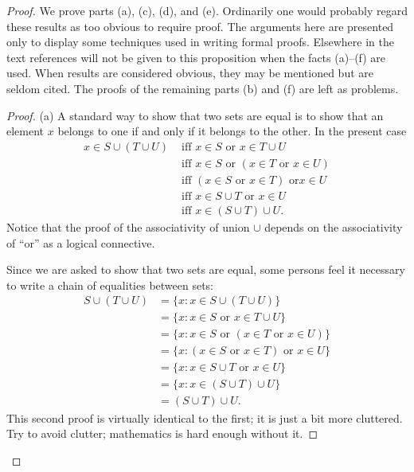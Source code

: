 \begin{proof} We prove parts (a), (c), (d), and (e).  Ordinarily one would probably regard
these results as too obvious to require proof.  The arguments here are presented only to
display some techniques used in writing formal proofs.  Elsewhere in the text references will
not be given to this proposition when the facts (a)--(f) are used.  When results are
considered obvious, they may be mentioned but are seldom cited.  The proofs of the remaining
parts (b) and (f) are left as problems.

\begin{proof} (a)  A standard way to show that two sets are equal is to show that an element
$x$ belongs to one if and only if it belongs to the other.  In the present case
 \begin{align*}
x \in S \cup(T \cup U) &\text{ iff } x \in S \text{ or } x \in T
\cup U \\
            &\text{ iff } x \in S \text{ or } (x \in T \text{ or }
x \in U)\\
            &\text{ iff } (x \in S \text{ or } x \in T) \text{ or
} x \in U\\
            &\text{ iff } x \in S \cup T \text{ or } x \in U\\
            &\text{ iff } x \in (S \cup T) \cup U.
 \end{align*}
Notice that the proof of the associativity of union $\cup$ depends on the associativity of
``or'' as a logical connective.

Since we are asked to show that two sets are equal, some persons feel it necessary to write a
chain of equalities between sets:
 \begin{align*}
     S \cup (T \cup U)  &= \{x\colon x \in S \cup (T \cup U)\}\\
                 &= \{x\colon x \in S \text{ or } x \in T \cup U\}\\
                 &= \{x\colon x \in S \text{ or }(x \in T \text{ or } x \in U)\}\\
                 &= \{x\colon (x \in S \text{ or } x \in T)\text{ or }x \in U\}\\
                 &= \{x\colon x \in S \cup T \text{ or } x \in U\}\\
                 &= \{x\colon x \in (S \cup T) \cup U\}\\
                 &= (S \cup T) \cup U.
 \end{align*}
This second proof is virtually identical to the first; it is just a bit more cluttered.  Try
to avoid clutter; mathematics is hard enough without it. \ns\end{proof}


\end{proof}
